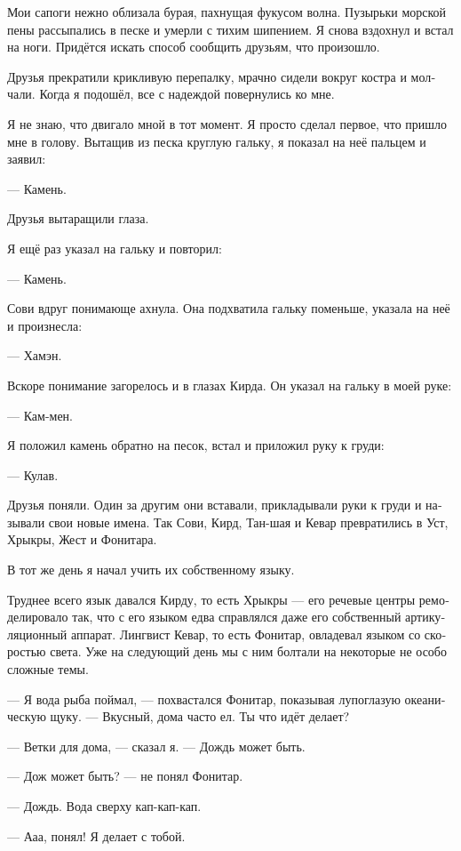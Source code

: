 \documentclass[a4paper,10pt,fleqn]{book}\usepackage{polyglossia}\setdefaultlanguage[babelshorthands=true]{russian}\setotherlanguage{english}\defaultfontfeatures{Ligatures=TeX,Mapping=tex-text}
\newcommand{\asterism}{\vspace{1em}{\centering\Large\bfseries$\ast~\ast~\ast$\par}\vspace{1em}}
\begin{document}
Мои сапоги нежно облизала бурая, пахнущая фукусом волна.
Пузырьки морской пены рассыпались в песке и умерли с тихим шипением.
Я снова вздохнул и встал на ноги.
Придётся искать способ сообщить друзьям, что произошло.

\asterism

Друзья прекратили крикливую перепалку, мрачно сидели вокруг костра и молчали.
Когда я подошёл, все с надеждой повернулись ко мне.

Я не знаю, что двигало мной в тот момент.
Я просто сделал первое, что пришло мне в голову.
Вытащив из песка круглую гальку, я показал на неё пальцем и заявил:

--- Камень.

Друзья вытаращили глаза.

Я ещё раз указал на гальку и повторил:

--- Камень.

Сови вдруг понимающе ахнула.
Она подхватила гальку поменьше, указала на неё и произнесла:

--- Хамэн.

Вскоре понимание загорелось и в глазах Кирда.
Он указал на гальку в моей руке:

--- Кам-мен.

Я положил камень обратно на песок, встал и приложил руку к груди:

--- Кулав.

Друзья поняли.
Один за другим они вставали, прикладывали руки к груди и называли свои новые имена.
Так Сови, Кирд, Тан-шая и Кевар превратились в Уст, Хрыкры, Жест и Фонитара.

В тот же день я начал учить их собственному языку.

\asterism

Труднее всего язык давался Кирду, то есть Хрыкры --- его речевые центры ремоделировало так, что с его языком едва справлялся даже его собственный артикуляционный аппарат.
Лингвист Кевар, то есть Фонитар, овладевал языком со скоростью света.
Уже на следующий день мы с ним болтали на некоторые не особо сложные темы.

--- Я вода рыба поймал, --- похвастался Фонитар, показывая лупоглазую океаническую щуку.
--- Вкусный, дома часто ел.
Ты что идёт делает?

--- Ветки для дома, --- сказал я.
--- Дождь может быть.

--- Дож может быть? --- не понял Фонитар.

--- Дождь.
Вода сверху кап-кап-кап.

--- Ааа, понял!
Я делает с тобой.
\end{document}
